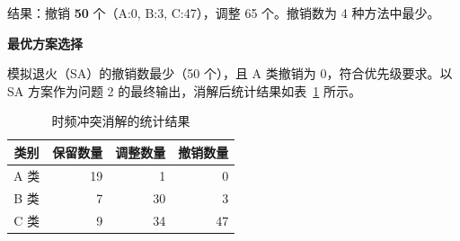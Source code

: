 结果：撤销 \textbf{50} 个（A:0, B:3, C:47），调整 65 个。撤销数为 4 种方法中最少。

\textbf{最优方案选择}

模拟退火（SA）的撤销数最少（50 个），且 A 类撤销为 0，符合优先级要求。以 SA 方案作为问题 2 的最终输出，消解后统计结果如表~\ref{tab:q2_result} 所示。

\begin{table}[htbp]
\centering
\caption{时频冲突消解的统计结果}
\label{tab:q2_result}
\begin{tabular}{crrr}
\toprule
类别 & 保留数量 & 调整数量 & 撤销数量 \\
\midrule
A 类 & 19 & 1 & 0 \\
B 类 & 7 & 30 & 3 \\
C 类 & 9 & 34 & 47 \\
\bottomrule
\end{tabular}
\end{table}
